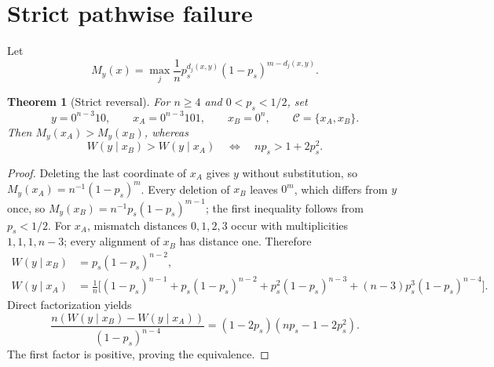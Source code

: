 \documentclass[11pt]{article}
\newtheorem{theorem}{Theorem}
\theoremstyle{remark}\newtheorem{remark}[theorem]{Remark}
\newcommand{\C}{\mathcal C}\newcommand{\I}{\mathcal I}\newcommand{\one}{\mathbf 1}
\begin{document}
\section{Strict pathwise failure}
Let
\[
 M_y(x)=\max_j\frac1n p_s^{d_j(x,y)}(1-p_s)^{m-d_j(x,y)}.
\]
\begin{theorem}[Strict reversal]\label{thm:rev}
For $n\ge4$ and $0<p_s<1/2$, set
\[
 y=0^{n-3}10,\qquad x_A=0^{n-3}101,\qquad x_B=0^n,\qquad \C=\{x_A,x_B\}.
\]
Then $M_y(x_A)>M_y(x_B)$, whereas
\[
 W(y\mid x_B)>W(y\mid x_A)\quad\Longleftrightarrow\quad np_s>1+2p_s^2.
\]
\end{theorem}
\begin{proof}
Deleting the last coordinate of $x_A$ gives $y$ without substitution, so
$M_y(x_A)=n^{-1}(1-p_s)^m$. Every deletion of $x_B$ leaves $0^m$, which differs from $y$ once,
so $M_y(x_B)=n^{-1}p_s(1-p_s)^{m-1}$; the first inequality follows from $p_s<1/2$.
For $x_A$, mismatch distances $0,1,2,3$ occur with multiplicities $1,1,1,n-3$; every alignment
of $x_B$ has distance one. Therefore
\begin{align*}
 W(y\mid x_B)&=p_s(1-p_s)^{n-2},\\
 W(y\mid x_A)&=\frac1n\bigl[(1-p_s)^{n-1}+p_s(1-p_s)^{n-2}
 +p_s^2(1-p_s)^{n-3}+(n-3)p_s^3(1-p_s)^{n-4}\bigr].
\end{align*}
Direct factorization yields
\[
 \frac{n(W(y\mid x_B)-W(y\mid x_A))}{(1-p_s)^{n-4}}
 =(1-2p_s)(np_s-1-2p_s^2).
\]
The first factor is positive, proving the equivalence.
\end{proof}
\end{document}
